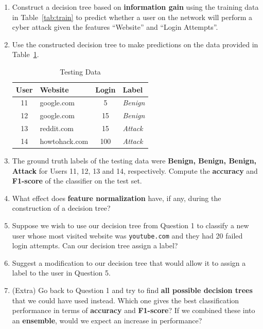 \documentclass[12pt,a4paper]{article}
\begin{document}
\begin{enumerate}
  \item Construct a decision tree based on \textbf{information gain} using the training data in Table~\ref{tab:train} to predict whether a user on the network will perform a cyber attack given the features ``Website'' and ``Login Attempts''.

  \item Use the constructed decision tree to make predictions on the data provided in Table~\ref{tab:test}.

        \begin{table}[h!]
          \centering
          \caption{Testing Data}
          \label{tab:test}
          \begin{tabular}{c l c l}
            \toprule
            \textbf{User} & \textbf{Website} & \textbf{Login} & \textbf{Label}  \\
            \midrule
            11            & google.com       & 5              & \textit{Benign} \\
            12            & google.com       & 15             & \textit{Benign} \\
            13            & reddit.com       & 15             & \textit{Attack} \\
            14            & howtohack.com    & 100            & \textit{Attack} \\
            \bottomrule
          \end{tabular}
        \end{table}

  \item The ground truth labels of the testing data were \textbf{Benign, Benign, Benign, Attack} for Users 11, 12, 13 and 14, respectively. Compute the \textbf{accuracy} and \textbf{F1-score} of the classifier on the test set.

  \item What effect does \textbf{feature normalization} have, if any, during the construction of a decision tree?

  \item Suppose we wish to use our decision tree from Question 1 to classify a new user whose most visited website was \texttt{youtube.com} and they had 20 failed login attempts. Can our decision tree assign a label?

  \item Suggest a modification to our decision tree that would allow it to assign a label to the user in Question 5.

  \item (Extra) Go back to Question 1 and try to find \textbf{all possible decision trees} that we could have used instead. Which one gives the best classification performance in terms of \textbf{accuracy} and \textbf{F1-score}? If we combined these into an \textbf{ensemble}, would we expect an increase in performance?
\end{enumerate}
\end{document}

